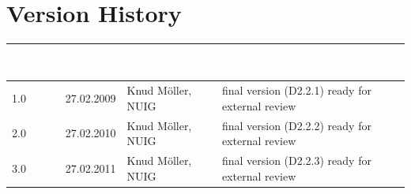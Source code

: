 \documentclass{article}
\newcommand\authorOne{Knud Möller, NUIG}
\begin{document}
\section*{Version History}

\begin{small}
\begin{tabular}{|l|l|l|p{7.5cm}|}
\hline
\rowcolor{fast@lightgrey}\textcolor{white}{\textbf{Rev. No.}} &
                            \textcolor{white}{\textbf{Date}} &
                            \textcolor{white}{\textbf{Author (Partner)}} &
							\textcolor{white}{\textbf{Change description}}\\ \hline
1.0 & 27.02.2009 & \authorOne & final version (D2.2.1) ready for external review \\ \hline
2.0 & 27.02.2010 & \authorOne & final version (D2.2.2) ready for external review \\ \hline
3.0 & 27.02.2011 & \authorOne & final version (D2.2.3) ready for external review \\ \hline
\end{tabular}
\end{small}

\color{black}

\vfill

\newpage


\clearpage
\end{document}
